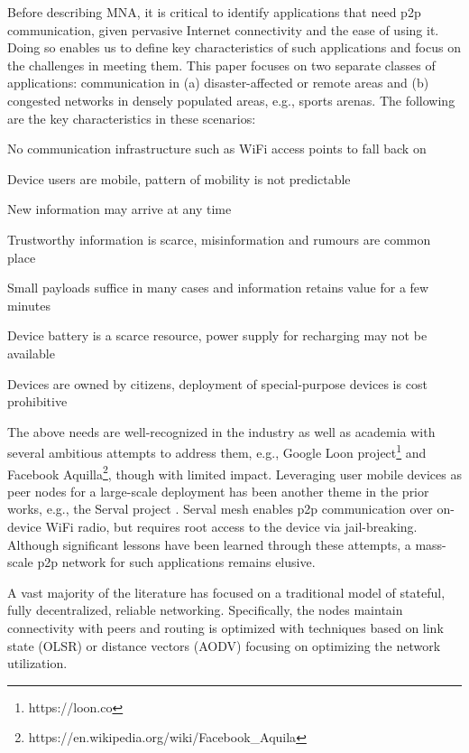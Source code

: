 \documentclass[conference]{IEEEtran}
\newcommand{\taskprefix}{CH}
\newcommand{\tasksize}{\normalsize}
\newenvironment{taskenv}[1]{\begin{list}{{\tasksize\sc \theenumi.}}{\usecounter{enumi}
      \settowidth{\labelwidth}{{\tasksize\sc \taskprefix#1-99}}
      \setlength{\leftmargin}{\labelwidth}
}}{\end{list}}
\newcounter{task}
\newcommand{\btask}{\begin{taskenv}{\taskprefix}\setcounter{enumi}{\value{task}}\renewcommand{\theenumi}{\taskprefix$_{\arabic{enumi}}$}}
\newcommand{\etask}{\setcounter{task}{\value{enumi}}\renewcommand{\theenumi}{\arabic{enumi}.}\end{taskenv}}
\begin{document}
Before describing MNA, it is critical to identify applications that
need p2p communication, given pervasive Internet connectivity and the
ease of using it. Doing so enables us to define key characteristics of
such applications and focus on the challenges in meeting them.  This
paper focuses on two separate classes of applications: communication
in (a) disaster-affected or remote areas and (b) congested networks in
densely populated areas, e.g., sports arenas.  The following are the
key characteristics in these scenarios:

%
\btask
%
\item\label{c:0} No communication infrastructure such as WiFi
  access points to fall back on
\item\label{c:1} Device users are mobile, pattern of mobility is not
  predictable
\item\label{c:2} New information may arrive at any time
\item\label{c:3} Trustworthy information is scarce, misinformation and
  rumours are common place
\item\label{c:4}  Small payloads suffice in many cases and information
  retains value for a few minutes
\item\label{c:5}  Device battery is a scarce resource, power supply
  for recharging may not be available
\item\label{c:6}  Devices are owned by citizens, deployment of
  special-purpose devices is cost prohibitive
%
\etask
%

The above needs are well-recognized in the industry as well as
academia with several ambitious attempts to address them, e.g., Google
Loon project\footnote{https://loon.co} and Facebook
Aquilla\footnote{https://en.wikipedia.org/wiki/Facebook\_Aquila},
though with limited impact. Leveraging user mobile devices as peer
nodes for a large-scale deployment has been another theme in the prior
works, e.g., the Serval project
\cite{gardner-stephen-serval-2011}. Serval mesh enables p2p
communication over on-device WiFi radio, but requires root access to
the device via jail-breaking. Although significant lessons have been
learned through these attempts, a mass-scale p2p network for such
applications remains elusive.

A vast majority of the literature has focused on a traditional model
of stateful, fully decentralized, reliable networking. Specifically,
the nodes maintain connectivity with peers and routing is optimized
with techniques based on link state (OLSR) or distance vectors (AODV)
\cite{clausen-olsr-2003,perkins-aodv-2003} focusing on optimizing the
network utilization.
\end{document}
